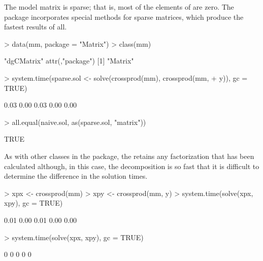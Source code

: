 \documentclass{article}
\begin{document}
The model matrix  is sparse; that is, most of the elements of
 are zero.  The  package incorporates special
methods for sparse matrices, which produce the fastest results of all.

\begin{Schunk}
\begin{Sinput}
> data(mm, package = "Matrix")
> class(mm)
\end{Sinput}
\begin{Soutput}
[1] "dgCMatrix"
attr(,"package")
[1] "Matrix"
\end{Soutput}
\begin{Sinput}
> system.time(sparse.sol <- solve(crossprod(mm), crossprod(mm, 
+     y)), gc = TRUE)
\end{Sinput}
\begin{Soutput}
[1] 0.03 0.00 0.03 0.00 0.00
\end{Soutput}
\begin{Sinput}
> all.equal(naive.sol, as(sparse.sol, "matrix"))
\end{Sinput}
\begin{Soutput}
[1] TRUE
\end{Soutput}
\end{Schunk}

As with other classes in the  package, the
 retains any factorization that has been calculated
although, in this case, the decomposition is so fast that it is
difficult to determine the difference in the solution times.

\begin{Schunk}
\begin{Sinput}
> xpx <- crossprod(mm)
> xpy <- crossprod(mm, y)
> system.time(solve(xpx, xpy), gc = TRUE)
\end{Sinput}
\begin{Soutput}
[1] 0.01 0.00 0.01 0.00 0.00
\end{Soutput}
\begin{Sinput}
> system.time(solve(xpx, xpy), gc = TRUE)
\end{Sinput}
\begin{Soutput}
[1] 0 0 0 0 0
\end{Soutput}
\end{Schunk}


\end{document}
